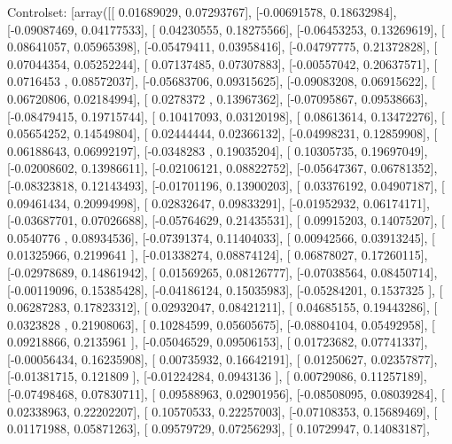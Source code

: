 \documentclass{article}
\begin{document}
Controlset: [array([[ 0.01689029,  0.07293767],
       [-0.00691578,  0.18632984],
       [-0.09087469,  0.04177533],
       [ 0.04230555,  0.18275566],
       [-0.06453253,  0.13269619],
       [ 0.08641057,  0.05965398],
       [-0.05479411,  0.03958416],
       [-0.04797775,  0.21372828],
       [ 0.07044354,  0.05252244],
       [ 0.07137485,  0.07307883],
       [-0.00557042,  0.20637571],
       [ 0.0716453 ,  0.08572037],
       [-0.05683706,  0.09315625],
       [-0.09083208,  0.06915622],
       [ 0.06720806,  0.02184994],
       [ 0.0278372 ,  0.13967362],
       [-0.07095867,  0.09538663],
       [-0.08479415,  0.19715744],
       [ 0.10417093,  0.03120198],
       [ 0.08613614,  0.13472276],
       [ 0.05654252,  0.14549804],
       [ 0.02444444,  0.02366132],
       [-0.04998231,  0.12859908],
       [ 0.06188643,  0.06992197],
       [-0.0348283 ,  0.19035204],
       [ 0.10305735,  0.19697049],
       [-0.02008602,  0.13986611],
       [-0.02106121,  0.08822752],
       [-0.05647367,  0.06781352],
       [-0.08323818,  0.12143493],
       [-0.01701196,  0.13900203],
       [ 0.03376192,  0.04907187],
       [ 0.09461434,  0.20994998],
       [ 0.02832647,  0.09833291],
       [-0.01952932,  0.06174171],
       [-0.03687701,  0.07026688],
       [-0.05764629,  0.21435531],
       [ 0.09915203,  0.14075207],
       [ 0.0540776 ,  0.08934536],
       [-0.07391374,  0.11404033],
       [ 0.00942566,  0.03913245],
       [ 0.01325966,  0.2199641 ],
       [-0.01338274,  0.08874124],
       [ 0.06878027,  0.17260115],
       [-0.02978689,  0.14861942],
       [ 0.01569265,  0.08126777],
       [-0.07038564,  0.08450714],
       [-0.00119096,  0.15385428],
       [-0.04186124,  0.15035983],
       [-0.05284201,  0.1537325 ],
       [ 0.06287283,  0.17823312],
       [ 0.02932047,  0.08421211],
       [ 0.04685155,  0.19443286],
       [ 0.0323828 ,  0.21908063],
       [ 0.10284599,  0.05605675],
       [-0.08804104,  0.05492958],
       [ 0.09218866,  0.2135961 ],
       [-0.05046529,  0.09506153],
       [ 0.01723682,  0.07741337],
       [-0.00056434,  0.16235908],
       [ 0.00735932,  0.16642191],
       [ 0.01250627,  0.02357877],
       [-0.01381715,  0.121809  ],
       [-0.01224284,  0.0943136 ],
       [ 0.00729086,  0.11257189],
       [-0.07498468,  0.07830711],
       [ 0.09588963,  0.02901956],
       [-0.08508095,  0.08039284],
       [ 0.02338963,  0.22202207],
       [ 0.10570533,  0.22257003],
       [-0.07108353,  0.15689469],
       [ 0.01171988,  0.05871263],
       [ 0.09579729,  0.07256293],
       [ 0.10729947,  0.14083187],
\end{document}
